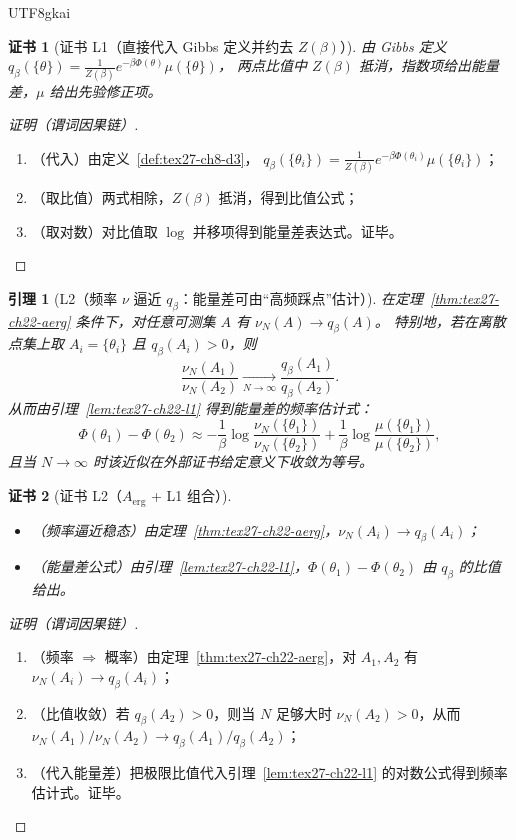\documentclass[12pt]{article}
\newtheorem{lemma}{引理}[section]
\newtheorem{Certificate}{证书}[section]
\begin{document}
\begin{CJK*}{UTF8}{gkai}
\begin{Certificate}[证书 L1（直接代入 Gibbs 定义并约去 $Z(\beta)$）]
\label{cert:tex27-ch22-l1}
由 Gibbs 定义 $q_\beta(\{\theta\})=\frac{1}{Z(\beta)}e^{-\beta\Phi(\theta)}\mu(\{\theta\})$，
两点比值中 $Z(\beta)$ 抵消，指数项给出能量差，$\mu$ 给出先验修正项。
\end{Certificate}

\begin{proof}[证明（谓词因果链）]
\begin{enumerate}
  \item（代入）由定义~\ref{def:tex27-ch8-d3}，
  $
    q_\beta(\{\theta_i\})=\frac{1}{Z(\beta)}e^{-\beta\Phi(\theta_i)}\mu(\{\theta_i\})
  $；
  \item（取比值）两式相除，$Z(\beta)$ 抵消，得到比值公式；
  \item（取对数）对比值取 $\log$ 并移项得到能量差表达式。证毕。
\end{enumerate}
\end{proof}

\begin{lemma}[L2（频率 $\nu$ 逼近 $q_\beta$：能量差可由“高频踩点”估计）]
\label{lem:tex27-ch22-l2}
在定理~\ref{thm:tex27-ch22-aerg} 条件下，对任意可测集 $A$ 有 $\nu_N(A)\to q_\beta(A)$。
特别地，若在离散点集上取 $A_i=\{\theta_i\}$ 且 $q_\beta(A_i)>0$，则
\[
  \frac{\nu_N(A_1)}{\nu_N(A_2)}\xrightarrow[N\to\infty]{}\frac{q_\beta(A_1)}{q_\beta(A_2)}.
\]
从而由引理~\ref{lem:tex27-ch22-l1} 得到能量差的频率估计式：
\[
  \Phi(\theta_1)-\Phi(\theta_2)
  \approx
  -\frac{1}{\beta}\log\frac{\nu_N(\{\theta_1\})}{\nu_N(\{\theta_2\})}
  +\frac{1}{\beta}\log\frac{\mu(\{\theta_1\})}{\mu(\{\theta_2\})},
\]
且当 $N\to\infty$ 时该近似在外部证书给定意义下收敛为等号。
\end{lemma}

\begin{Certificate}[证书 L2（$A_{\mathrm{erg}}$ + L1 组合）]
\label{cert:tex27-ch22-l2}
\begin{itemize}
  \item（频率逼近稳态）由定理~\ref{thm:tex27-ch22-aerg}，$\nu_N(A_i)\to q_\beta(A_i)$；
  \item（能量差公式）由引理~\ref{lem:tex27-ch22-l1}，$\Phi(\theta_1)-\Phi(\theta_2)$ 由 $q_\beta$ 的比值给出。
\end{itemize}
\end{Certificate}

\begin{proof}[证明（谓词因果链）]
\begin{enumerate}
  \item（频率 $\Rightarrow$ 概率）由定理~\ref{thm:tex27-ch22-aerg}，对 $A_1,A_2$ 有 $\nu_N(A_i)\to q_\beta(A_i)$；
  \item（比值收敛）若 $q_\beta(A_2)>0$，则当 $N$ 足够大时 $\nu_N(A_2)>0$，从而
  $\nu_N(A_1)/\nu_N(A_2)\to q_\beta(A_1)/q_\beta(A_2)$；
  \item（代入能量差）把极限比值代入引理~\ref{lem:tex27-ch22-l1} 的对数公式得到频率估计式。证毕。
\end{enumerate}
\end{proof}


\end{CJK*}
\end{document}
